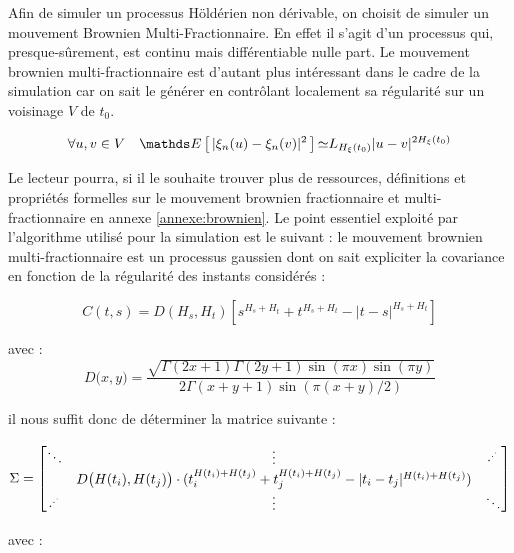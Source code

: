Afin de simuler un processus Höldérien non dérivable, on choisit de simuler un mouvement Brownien \linebreak Multi-Fractionnaire. En effet il s'agit d'un processus qui, presque-sûrement, est continu mais différentiable nulle part. Le mouvement brownien multi-fractionnaire est d'autant plus intéressant dans le cadre de la simulation car on sait le générer en contrôlant localement sa régularité sur un voisinage $V$ de $t_0$.

\begin{equation*}
	\forall u,v \in V \quad	\esperance{ | \xi_n(u) - \xi_n(v) |^2 } \mathbf{\simeq} L_{H_{\xi}(t_0) } |u - v|^{2 H_{\xi}(t_0)}
\end{equation*}

Le lecteur pourra, si il le souhaite trouver plus de ressources, définitions et propriétés formelles sur le mouvement brownien fractionnaire et multi-fractionnaire en annexe \ref{annexe:brownien}. Le point essentiel exploité par l'algorithme utilisé pour la simulation est le suivant : le mouvement brownien multi-fractionnaire est un processus gaussien dont on sait expliciter la covariance en fonction de la régularité des instants considérés :

$$
	C(t,s) = D(H_{s},H_{t})\left[s^{H_{s}+H_{t}}+t^{H_{s}+H_{t}}-|t-s|^{H_{s}+H_{t}}\right]
$$

avec :
$$
	D\bigl(x,y\bigr) = \frac{{\sqrt{\Gamma(2x+1)\Gamma(2y+1)\sin(\pi x)\sin(\pi y)}}}{2\Gamma(x+y+1)\sin(\pi(x+y)/2)}
$$

il nous suffit donc de déterminer la matrice suivante :

$$
	\Sigma = \begin{bmatrix}
		\ddots &                \vdots                                                                                                  & \cdot^{\cdot^{\cdot^{}}}
		\\
		       & D\bigl(H(t_i), H(t_j) \bigr)\cdot( t_i^{H(t_i) + H(t_j)} + t_j^{H(t_i) + H(t_j)} - |t_i-t_j|^{H(t_i) + H(t_j)} ) &
		\\
		    \cdot^{\cdot^{\cdot^{}}}   &       \vdots                                                                                                           & \ddots
	\end{bmatrix}
$$

avec :

